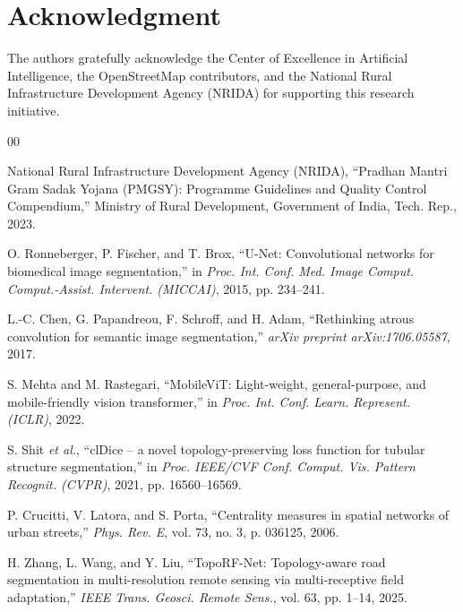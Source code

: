 \documentclass[conference]{IEEEtran}
\begin{document}
\section*{Acknowledgment}
The authors gratefully acknowledge the Center of Excellence in Artificial Intelligence, the OpenStreetMap contributors, and the National Rural Infrastructure Development Agency (NRIDA) for supporting this research initiative.

\begin{thebibliography}{00}

 National Rural Infrastructure Development Agency (NRIDA), ``Pradhan Mantri Gram Sadak Yojana (PMGSY): Programme Guidelines and Quality Control Compendium,'' Ministry of Rural Development, Government of India, Tech. Rep., 2023.

 O. Ronneberger, P. Fischer, and T. Brox, ``U-Net: Convolutional networks for biomedical image segmentation,'' in \textit{Proc. Int. Conf. Med. Image Comput. Comput.-Assist. Intervent. (MICCAI)}, 2015, pp. 234--241.

 L.-C. Chen, G. Papandreou, F. Schroff, and H. Adam, ``Rethinking atrous convolution for semantic image segmentation,'' \textit{arXiv preprint arXiv:1706.05587}, 2017.

 S. Mehta and M. Rastegari, ``MobileViT: Light-weight, general-purpose, and mobile-friendly vision transformer,'' in \textit{Proc. Int. Conf. Learn. Represent. (ICLR)}, 2022.

 S. Shit \textit{et al.}, ``clDice -- a novel topology-preserving loss function for tubular structure segmentation,'' in \textit{Proc. IEEE/CVF Conf. Comput. Vis. Pattern Recognit. (CVPR)}, 2021, pp. 16560--16569.

 P. Crucitti, V. Latora, and S. Porta, ``Centrality measures in spatial networks of urban streets,'' \textit{Phys. Rev. E}, vol. 73, no. 3, p. 036125, 2006.

 H. Zhang, L. Wang, and Y. Liu, ``TopoRF-Net: Topology-aware road segmentation in multi-resolution remote sensing via multi-receptive field adaptation,'' \textit{IEEE Trans. Geosci. Remote Sens.}, vol. 63, pp. 1--14, 2025.


\end{thebibliography}
\end{document}

